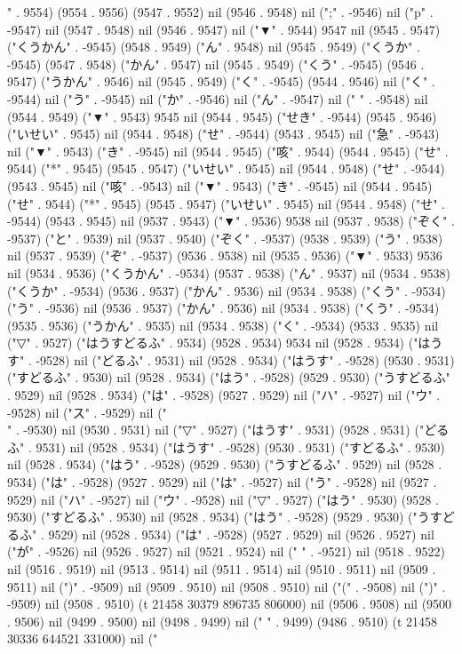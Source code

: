 " . 9554) (9554 . 9556) (9547 . 9552) nil (9546 . 9548) nil (";" . -9546) nil ("p" . -9547) nil (9547 . 9548) nil (9546 . 9547) nil ("▼" . 9544) 9547 nil (9545 . 9547) ("くうかん" . -9545) (9548 . 9549) ("ん" . 9548) nil (9545 . 9549) ("くうか" . -9545) (9547 . 9548) ("かん" . 9547) nil (9545 . 9549) ("くう" . -9545) (9546 . 9547) ("うかん" . 9546) nil (9545 . 9549) ("く" . -9545) (9544 . 9546) nil ("く" . -9544) nil ("う" . -9545) nil ("か" . -9546) nil ("ん" . -9547) nil (" " . -9548) nil (9544 . 9549) ("▼" . 9543) 9545 nil (9544 . 9545) ("せき" . -9544) (9545 . 9546) ("いせい" . 9545) nil (9544 . 9548) ("せ" . -9544) (9543 . 9545) nil ("急" . -9543) nil ("▼" . 9543) ("き" . -9545) nil (9544 . 9545) ("咳" . 9544) (9544 . 9545) ("せ" . 9544) ("*" . 9545) (9545 . 9547) ("いせい" . 9545) nil (9544 . 9548) ("せ" . -9544) (9543 . 9545) nil ("咳" . -9543) nil ("▼" . 9543) ("き" . -9545) nil (9544 . 9545) ("せ" . 9544) ("*" . 9545) (9545 . 9547) ("いせい" . 9545) nil (9544 . 9548) ("せ" . -9544) (9543 . 9545) nil (9537 . 9543) ("▼" . 9536) 9538 nil (9537 . 9538) ("ぞく" . -9537) ("と" . 9539) nil (9537 . 9540) ("ぞく" . -9537) (9538 . 9539) ("う" . 9538) nil (9537 . 9539) ("ぞ" . -9537) (9536 . 9538) nil (9535 . 9536) ("▼" . 9533) 9536 nil (9534 . 9536) ("くうかん" . -9534) (9537 . 9538) ("ん" . 9537) nil (9534 . 9538) ("くうか" . -9534) (9536 . 9537) ("かん" . 9536) nil (9534 . 9538) ("くう" . -9534) ("う" . -9536) nil (9536 . 9537) ("かん" . 9536) nil (9534 . 9538) ("くう" . -9534) (9535 . 9536) ("うかん" . 9535) nil (9534 . 9538) ("く" . -9534) (9533 . 9535) nil ("▽" . 9527) ("はうすどるふ" . 9534) (9528 . 9534) 9534 nil (9528 . 9534) ("はうす" . -9528) nil ("どるふ" . 9531) nil (9528 . 9534) ("はうす" . -9528) (9530 . 9531) ("すどるふ" . 9530) nil (9528 . 9534) ("はう" . -9528) (9529 . 9530) ("うすどるふ" . 9529) nil (9528 . 9534) ("は" . -9528) (9527 . 9529) nil ("ハ" . -9527) nil ("ウ" . -9528) nil ("ス" . -9529) nil ("\\" . -9530) nil (9530 . 9531) nil ("▽" . 9527) ("はうす" . 9531) (9528 . 9531) ("どるふ" . 9531) nil (9528 . 9534) ("はうす" . -9528) (9530 . 9531) ("すどるふ" . 9530) nil (9528 . 9534) ("はう" . -9528) (9529 . 9530) ("うすどるふ" . 9529) nil (9528 . 9534) ("は" . -9528) (9527 . 9529) nil ("は" . -9527) nil ("う" . -9528) nil (9527 . 9529) nil ("ハ" . -9527) nil ("ウ" . -9528) nil ("▽" . 9527) ("はう" . 9530) (9528 . 9530) ("すどるふ" . 9530) nil (9528 . 9534) ("はう" . -9528) (9529 . 9530) ("うすどるふ" . 9529) nil (9528 . 9534) ("は" . -9528) (9527 . 9529) nil (9526 . 9527) nil ("が" . -9526) nil (9526 . 9527) nil (9521 . 9524) nil (" " . -9521) nil (9518 . 9522) nil (9516 . 9519) nil (9513 . 9514) nil (9511 . 9514) nil (9510 . 9511) nil (9509 . 9511) nil (")" . -9509) nil (9509 . 9510) nil (9508 . 9510) nil ("(" . -9508) nil (")" . -9509) nil (9508 . 9510) (t 21458 30379 896735 806000) nil (9506 . 9508) nil (9500 . 9506) nil (9499 . 9500) nil (9498 . 9499) nil (" " . 9499) (9486 . 9510) (t 21458 30336 644521 331000) nil ("

